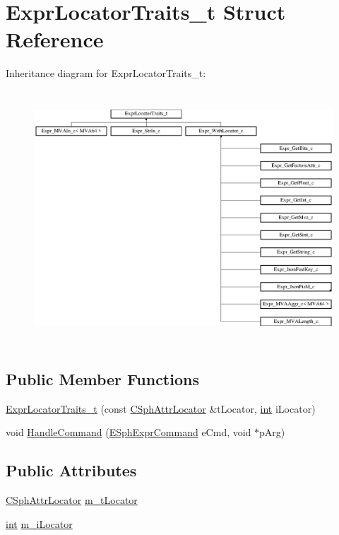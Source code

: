 \hypertarget{structExprLocatorTraits__t}{\section{Expr\-Locator\-Traits\-\_\-t Struct Reference}
\label{structExprLocatorTraits__t}
}
Inheritance diagram for Expr\-Locator\-Traits\-\_\-t\-:\begin{figure}[H]
\begin{center}
\leavevmode
\includegraphics[height=9.528795cm]{structExprLocatorTraits__t}
\end{center}
\end{figure}
\subsection*{Public Member Functions}
\begin{DoxyCompactItemize}
\item 
\hyperlink{structExprLocatorTraits__t_aa62ca00d67a9054bec4112455bb0e1e0}{Expr\-Locator\-Traits\-\_\-t} (const \hyperlink{structCSphAttrLocator}{C\-Sph\-Attr\-Locator} \&t\-Locator, \hyperlink{sphinxexpr_8cpp_a4a26e8f9cb8b736e0c4cbf4d16de985e}{int} i\-Locator)
\item 
void \hyperlink{structExprLocatorTraits__t_a295124ce545d214a21ba48030aa25e12}{Handle\-Command} (\hyperlink{sphinxexpr_8h_a30be184fb07bd80c271360fc6094c818}{E\-Sph\-Expr\-Command} e\-Cmd, void $\ast$p\-Arg)
\end{DoxyCompactItemize}
\subsection*{Public Attributes}
\begin{DoxyCompactItemize}
\item 
\hyperlink{structCSphAttrLocator}{C\-Sph\-Attr\-Locator} \hyperlink{structExprLocatorTraits__t_a4c62c299c26478e8ba9153ff2912da74}{m\-\_\-t\-Locator}
\item 
\hyperlink{sphinxexpr_8cpp_a4a26e8f9cb8b736e0c4cbf4d16de985e}{int} \hyperlink{structExprLocatorTraits__t_a596e9ebdf6a45a69b9da0f58d6d243f6}{m\-\_\-i\-Locator}
\end{DoxyCompactItemize}


